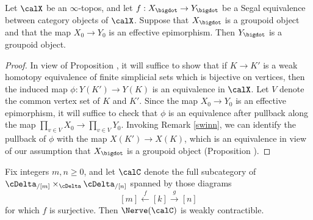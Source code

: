 \begin{lemma}\label{slavish}
Let $\calX$ be an $\infty$-topos, and let $f: X_{\bigdot} \rightarrow Y_{\bigdot}$ be a Segal equivalence between category objects of $\calX$. Suppose that $X_{\bigdot}$ is a groupoid object and that the map 
$X_0 \rightarrow Y_0$ is an effective epimorphism. Then $Y_{\bigdot}$ is a groupoid object.
\end{lemma}

\begin{proof}
In view of Proposition , it will suffice to show that if $K \rightarrow K'$ is a weak homotopy equivalence of finite simplicial sets which is bijective on vertices, then the induced map
$\phi: Y(K') \rightarrow Y(K)$ is an equivalence in $\calX$. Let $V$ denote the common vertex set of $K$ and $K'$. Since the map $X_0 \rightarrow Y_0$ is an effective epimorphism, it will suffice to check that
$\phi$ is an equivalence after pullback along the map $\prod_{v \in V} X_0 \rightarrow \prod_{v \in V} Y_0$. Invoking Remark \ref{swinn}, we can identify the pullback of $\phi$ with the map
$X(K') \rightarrow X(K)$, which is an equivalence in view of our assumption that $X_{\bigdot}$ is a groupoid object (Proposition ).
\end{proof}

\begin{lemma}\label{colk}
Fix integers $m, n \geq 0$, and let $\calC$ denote the full subcategory of
$\cDelta_{ / [m]} \times_{ \cDelta} \cDelta_{ / [n] }$ spanned by those diagrams
$$ [m] \stackrel{f}{\leftarrow} [k] \stackrel{g}{\rightarrow} [n]$$
for which $f$ is surjective. Then $\Nerve(\calC)$ is weakly contractible.
\end{lemma}

